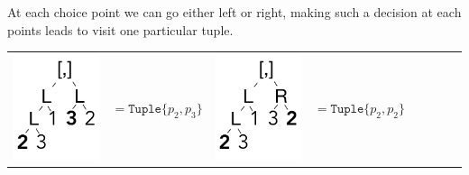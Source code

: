\documentclass[a4paper,english]{lipics-v2019}
\newcommand{\xt}[1]{\texttt{#1}}
\newcommand{\tuple}[1]{\xt{Tuple\{}#1\xt{\}}}
\begin{document}
\noindent
At each choice point we can go either left or right, making such a decision
at each points leads to visit one particular tuple.

\medskip
{\small
\begin{tabular}{@{}l@{~}ll@{~}ll@{~}ll@{~}l}
\begin{minipage}{1.2cm}\includegraphics[scale=.25]{figures/tree2.pdf} 
\end{minipage} &  $ =   \tuple{p_2,p_3} $ &
\begin{minipage}{1.2cm}\includegraphics[scale=.25]{figures/tree3.pdf} 
\end{minipage} &  $ =   \tuple{p_2,p_2} $ 

\end{tabular}}
\end{document}
